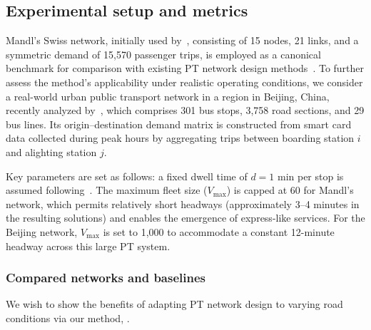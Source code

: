 \documentclass[a4paper,fleqn]{cas-sc}
\begin{document}
\subsection{Experimental setup and metrics}\label{sec:setup}
Mandl’s Swiss network, initially used by~\cite{mandl1980evaluation}, consisting of 15 nodes, 21 links, and a symmetric demand of 15{,}570 passenger trips, is employed as a canonical benchmark for comparison with existing PT network design methods~\citep{liang2025novel, ahern2022approximate}. To further assess the method’s applicability under realistic operating conditions, we consider a real-world urban public transport network in a region in Beijing, China, recently analyzed by~\cite{wu2024multi}, which comprises 301 bus stops, 3,758 road sections, and 29 bus lines. Its origin--destination demand matrix is constructed from smart card data collected during peak hours by aggregating trips between boarding station $i$ and alighting station $j$. 

Key parameters are set as follows: a fixed dwell time of $d=1$ min per stop is assumed following~\cite{chen2022TRSC}. 
The maximum fleet size ($V_{\max}$) is capped at 60 for Mandl’s network, which permits relatively short headways (approximately 3–4 minutes in the resulting solutions) and enables the emergence of express-like services. 
For the Beijing network, $V_{\max}$ is set to 1,000 to accommodate a constant 12-minute headway across this large PT system. 

\subsubsection{Compared networks and baselines}
\label{sec:compared-PT-networks}

We wish to show the benefits of adapting PT network design  to varying road conditions via our method, .
\end{document}
